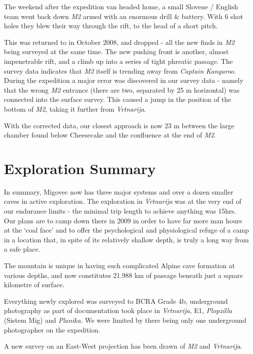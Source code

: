 The weekend after the expedition van headed home, a small Slovene /
English team went back down \emph{M2} armed with an enormous drill \&
battery. With 6 shot holes they blew their way through the rift, to the
head of a short pitch.

This was returned to in October 2008, and dropped - all the new finds in
\emph{M2} being surveyed at the same time. The new pushing front is
another, almost impenetrable rift, and a climb up into a series of tight
phreatic passage. The survey data indicates that \emph{M2} itself is
trending away from \emph{Captain Kangaroo}. During the expedition a
major error was discovered in our survey data - namely that the wrong
\emph{M2} entrance (there are two, separated by 25 m horizontal) was
connected into the surface survey. This caused a jump in the position of
the bottom of \emph{M2}, taking it further from \emph{Vrtnarija}.

With the corrected data, our closest approach is now 23 m between the
large chamber found below Cheesecake and the confluence at the end of
\emph{M2}.

\hypertarget{exploration-summary}{%
\section{Exploration Summary}\label{exploration-summary}}

In summary, Migovec now has three major systems and over a dozen smaller
caves in active exploration. The exploration in \emph{Vrtnarija} was at
the very end of our endurance limits - the minimal trip length to
achieve anything was 15hrs. Our plans are to camp down there in 2009 in
order to have far more man hours at the `coal face' and to offer the
psychological and physiological refuge of a camp in a location that, in
spite of its relatively shallow depth, is truly a long way from a safe
place.

The mountain is unique in having such complicated Alpine cave formation
at various depths, and now constitutes 21.988 km of passage beneath just
a square kilometre of surface.

Everything newly explored was surveyed to BCRA Grade 4b, underground
photography as part of documentation took place in \emph{Vrtnarija}, E1,
\emph{Plopzilla} (Sistem Mig) and \emph{Planika}. We were limited by
there being only one underground photographer on the expedition.

A new survey on an East-West projection has been drawn of \emph{M2} and
\emph{Vrtnarija}.

